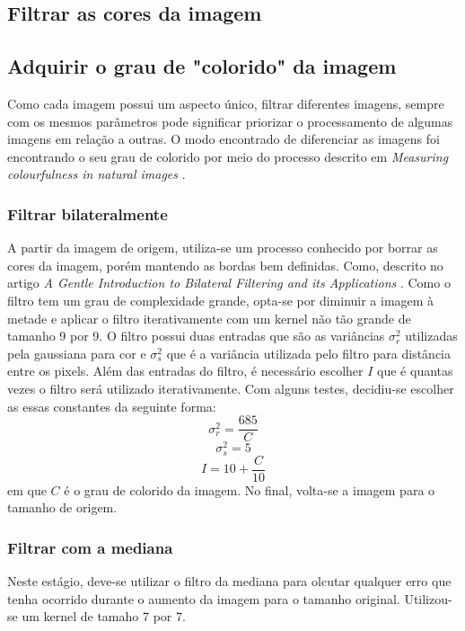 \documentclass[10pt,technote]{IEEEtran}
\begin{document}
		\subsection{Filtrar as cores da imagem}
			\subsection{Adquirir o grau de "colorido" da imagem}
				Como cada imagem possui um aspecto único, filtrar diferentes imagens, sempre com os mesmos parâmetros pode significar priorizar o processamento de algumas imagens em relação a outras. O modo encontrado de diferenciar as imagens foi encontrando o seu grau de colorido por meio do processo descrito em \textit{Measuring colourfulness in natural images} \cite{CITE-colourfuness}.
			\subsubsection{Filtrar bilateralmente}
				A partir da imagem de origem, utiliza-se um processo conhecido por borrar as cores da imagem, porém mantendo as bordas bem definidas. Como, descrito no artigo \textit{A Gentle Introduction to Bilateral Filtering and its Applications} \cite{CITE-bilateralfilter}.
				Como o filtro tem um grau de complexidade grande, opta-se por diminuir a imagem à metade e aplicar o filtro iterativamente com um kernel não tão grande de tamanho 9 por 9. O filtro possui duas entradas que são as variâncias $\sigma_r^2$ utilizadas pela gaussiana para cor e $\sigma_s^2$ que é a variância utilizada pelo filtro para distância entre os pixels. Além das entradas do filtro, é necessário escolher $I$ que é quantas vezes o filtro será utilizado iterativamente. Com alguns testes, decidiu-se escolher as essas constantes da seguinte forma:
				$$
				\sigma_r^2 = 	\frac{685}{C}
				$$
				$$
				\sigma_s^2 = 5
				$$
				$$
				I = 10 + \frac{C}{10}
				$$
				em que $C$ é o grau de colorido da imagem.
				No final, volta-se a imagem para o tamanho de origem.
			\subsubsection{Filtrar com a mediana}
			Neste estágio, deve-se utilizar o filtro da mediana para olcutar qualquer erro que tenha ocorrido durante o aumento da imagem para o tamanho original. Utilizou-se um kernel de tamaho 7 por 7.
\end{document}
